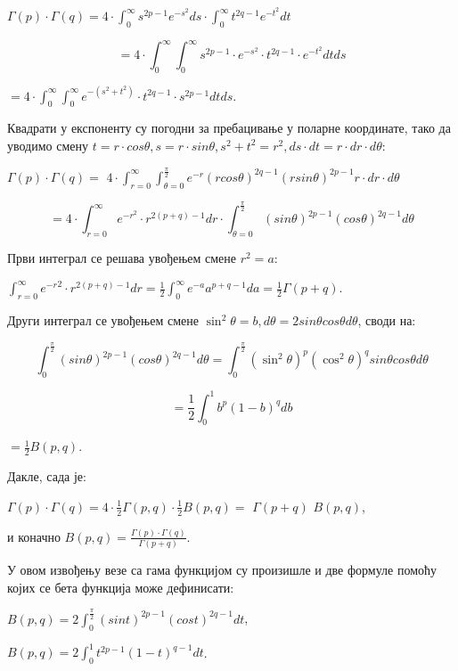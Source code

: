 \(\Gamma(p) \cdot \Gamma(q) = 4 \cdot \int_{0}^{\infty}s^{2p - 1}e^{- s^{2}}ds \cdot \int_{0}^{\infty}t^{2q - 1}e^{- t^{2}}dt\)

\[= 4 \cdot \int_{0}^{\infty}\int_{0}^{\infty}s^{2p - 1} \cdot e^{- s^{2}} \cdot t^{2q - 1} \cdot e^{- t^{2}}dtds\]

\(= 4 \cdot \int_{0}^{\infty}\int_{0}^{\infty}e^{- (s^{2} + t^{2})} \cdot t^{2q - 1} \cdot s^{2p - 1}dtds\).

Квадрати у експоненту су погодни за пребацивање у поларне координате,
тако да уводимо смену
\(t = r \cdot cos\theta,s = r \cdot sin\theta,s^{2} + t^{2} = r^{2},ds \cdot dt = r \cdot dr \cdot d\theta\):

\(\Gamma(p) \cdot \Gamma(q) =\)
\(4 \cdot \int_{r = 0}^{\infty}\int_{\theta = 0}^{\frac{\pi}{2}}e^{- r}{(rcos\theta)}^{2q - 1}{(rsin\theta)}^{2p - 1}r \cdot dr \cdot d\theta\)

\[= 4 \cdot \int_{r = 0}^{\infty}e^{- r^{2}} \cdot r^{2(p + q) - 1}dr \cdot \int_{\theta = 0}^{\frac{\pi}{2}}{(sin\theta)}^{2p - 1}{(cos\theta)}^{2q - 1}d\theta\]

Први интеграл се решава увођењем смене \(r^{2} = a\):

\(\int_{r = 0}^{\infty}{e^{- r}}^{2} \cdot r^{2(p + q) - 1}dr = \frac{1}{2}\int_{0}^{\infty}e^{- a}a^{p + q - 1}da = \frac{1}{2}\Gamma(p + q)\).

Други интеграл се увођењем смене
\(\sin^{2}\theta = b,d\theta = 2sin\theta cos\theta d\theta\), своди на:

\[\int_{0}^{\frac{\pi}{2}}{(sin\theta)}^{2p - 1}{(cos\theta)}^{2q - 1}d\theta = \int_{0}^{\frac{\pi}{2}}{(\sin^{2}\theta)}^{p}{(\cos^{2}\theta)}^{q}sin\theta cos\theta d\theta\]

\[= \frac{1}{2}\int_{0}^{1}b^{p}{(1 - b)}^{q}db\]

\(= \frac{1}{2}B(p,q)\).

Дакле, сада је:

\(\Gamma(p) \cdot \Gamma(q) = 4 \cdot \frac{1}{2}\Gamma(p,q) \cdot \frac{1}{2}B(p,q) =\)
\(\Gamma(p + q)\) \(B(p,q)\),

и коначно \(B(p,q) = \frac{\Gamma(p) \cdot \Gamma(q)}{\Gamma(p + q)}\).

У овом извођењу везе са гама функцијом су произишле и две формуле помоћу
којих се бета функција може дефинисати:

\(B(p,q) = 2\int_{0}^{\frac{\pi}{2}}{(sint)}^{2p - 1}{(cost)}^{2q - 1}dt\),

\(B(p,q) = 2\int_{0}^{1}t^{2p - 1}{(1 - t)}^{q - 1}dt\).

